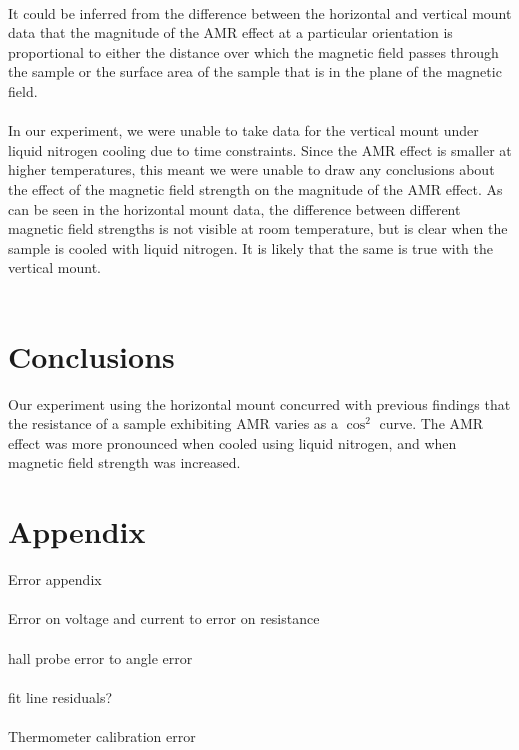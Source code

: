 \documentclass[10pt, twocolumn]{revtex4}
\begin{document}
\\
It could be inferred from the difference between the horizontal and vertical mount data that the magnitude of the AMR effect at a particular orientation is proportional to either the distance over which the magnetic field passes through the sample or the surface area of the sample that is in the plane of the magnetic field. \\
\\
In our experiment, we were unable to take data for the vertical mount under liquid nitrogen cooling due to time constraints. Since the AMR effect is smaller at higher temperatures, this meant we were unable to draw any conclusions about the effect of the magnetic field strength on the magnitude of the AMR effect. As can be seen in the horizontal mount data, the difference between different magnetic field strengths is not visible at room temperature, but is clear when the sample is cooled with liquid nitrogen. It is likely that the same is true with the vertical mount.\\
\\

\section{Conclusions}

Our experiment using the horizontal mount concurred with previous findings that the resistance of a sample exhibiting AMR varies as a $\cos^2$ curve. The AMR effect was more pronounced when cooled using liquid nitrogen, and when magnetic field strength was increased.






\newpage


\section{Appendix}

Error appendix\\
\\
Error on voltage and current to error on resistance\\
\\
hall probe error to angle error\\
\\
fit line residuals?\\
\\
Thermometer calibration error\\
\\
\end{document}
